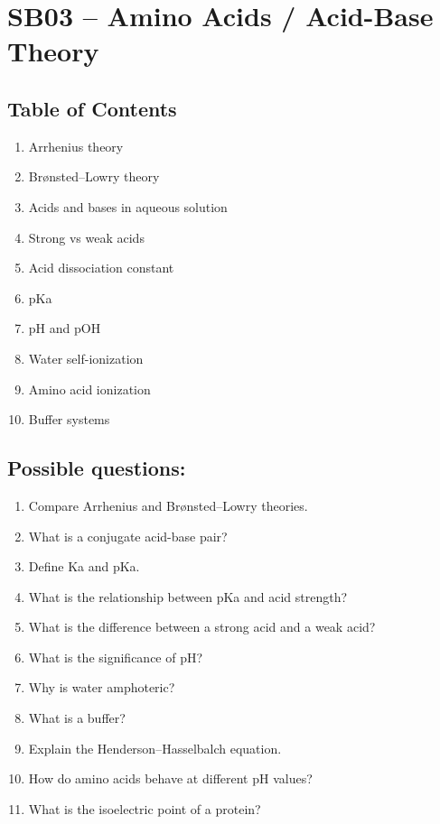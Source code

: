 \section{SB03 -- Amino Acids / Acid-Base Theory}

\subsection*{Table of Contents}
\begin{enumerate}
\item Arrhenius theory
\item Br{\o}nsted--Lowry theory
\item Acids and bases in aqueous solution
\item Strong vs weak acids
\item Acid dissociation constant
\item pKa
\item pH and pOH
\item Water self-ionization
\item Amino acid ionization
\item Buffer systems
\end{enumerate}

\subsection*{Possible questions:}
\begin{enumerate}
\item{Compare Arrhenius and Br{\o}nsted--Lowry theories.}
\item{What is a conjugate acid-base pair?}
\item{Define Ka and pKa.}
\item{What is the relationship between pKa and acid strength?}
\item{What is the difference between a strong acid and a weak acid?}
\item{What is the significance of pH?}
\item{Why is water amphoteric?}
\item{What is a buffer?}
\item{Explain the Henderson--Hasselbalch equation.}
\item{How do amino acids behave at different pH values?}
\item{What is the isoelectric point of a protein?}
\end{enumerate}